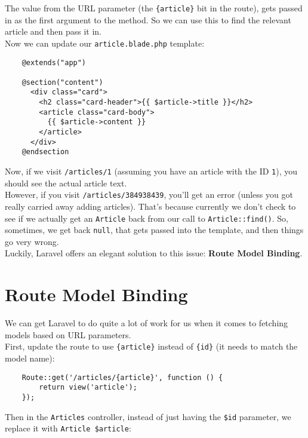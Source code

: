 The value from the URL parameter (the \texttt{\{article\}} bit in the route), gets passed in as the first argument to the method. So we can use this to find the relevant article and then pass it in.
\\

Now we can update our \texttt{article.blade.php} template:

\begin{verbatim}
    @extends("app")

    @section("content")
      <div class="card">
        <h2 class="card-header">{{ $article->title }}</h2>
        <article class="card-body">
          {{ $article->content }}
        </article>
      </div>
    @endsection
\end{verbatim}

Now, if we visit \texttt{/articles/1} (assuming you have an article with the ID \texttt{1}), you should see the actual article text.
\\

However, if you visit \texttt{/articles/384938439}, you'll get an error (unless you got really carried away adding articles). That's because currently we don't check to see if we actually get an \texttt{Article} back from our call to \texttt{Article::find()}. So, sometimes, we get back \texttt{null}, that gets passed into the template, and then things go very wrong.
\\

Luckily, Laravel offers an elegant solution to this issue: \textbf{Route Model Binding}.


\section{Route Model Binding}

We can get Laravel to do quite a lot of work for us when it comes to fetching models based on URL parameters.
\\

First, update the route to use \texttt{\{article\}} instead of \texttt{\{id\}} (it needs to match the model name):

\begin{verbatim}
    Route::get('/articles/{article}', function () {
        return view('article');
    });
\end{verbatim}

Then in the \texttt{Articles} controller, instead of just having the \texttt{\$id} parameter, we replace it with \texttt{Article \$article}:

